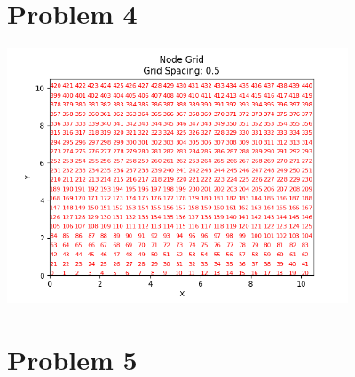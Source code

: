 \documentclass{article}
\begin{document}
    \section*{Problem 4}
        \includegraphics[height=3in]{node_grid.png}

    \section*{Problem 5}
\end{document}
